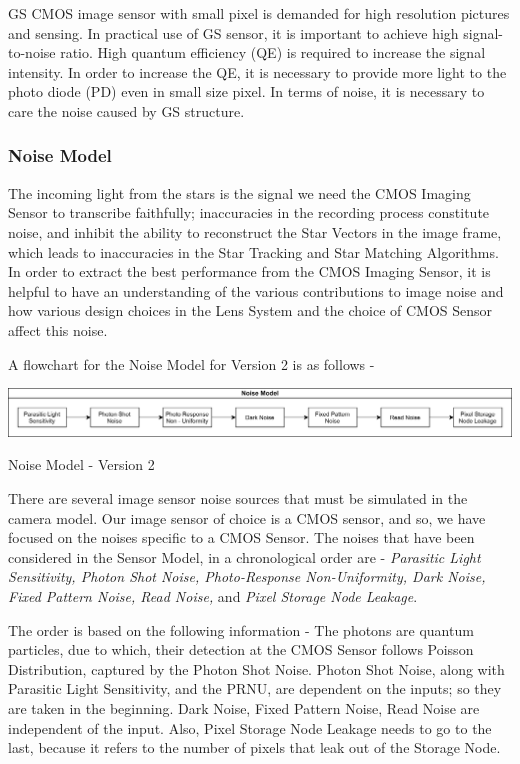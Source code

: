 \documentclass[../../main.tex]{subfiles}
\begin{document}
GS CMOS image sensor with small pixel is demanded for high resolution pictures and sensing. In practical use of GS sensor, it is important to achieve high signal-to-noise ratio. High quantum efficiency (QE) is required to increase the signal intensity. In order to increase the QE, it is necessary to provide more light to the photo diode (PD) even in small size pixel. In terms of noise, it is necessary to care the noise caused by GS structure.


\subsubsection{Noise Model} %
The incoming light from the stars is the signal we need the CMOS Imaging Sensor to transcribe faithfully; inaccuracies in the recording process constitute noise, and inhibit the ability to reconstruct the Star Vectors in the image frame, which leads to inaccuracies in the Star Tracking and Star Matching Algorithms. In order to extract the best performance from the CMOS Imaging Sensor, it is helpful to have an understanding of the various contributions to image noise and how various design choices in the Lens System and the choice of CMOS Sensor affect this noise.

A flowchart for the Noise Model for Version 2 is as follows -

\begin{Flowchart}[h!]
    \centering
    \includegraphics[scale=0.09]{Figures/Model/Noise Model.png}
    \caption{Noise Model - Version 2}
    \label{fig:SIS_v2_NM}
\end{Flowchart}

There are several image sensor noise sources that must be simulated in the camera model. Our image sensor of choice is a CMOS sensor, and so, we have focused on the noises specific to a CMOS Sensor. The noises that have been considered in the Sensor Model, in a chronological order are - \emph{Parasitic Light Sensitivity, Photon Shot Noise, Photo-Response Non-Uniformity, Dark Noise, Fixed Pattern Noise, Read Noise,} and \emph{Pixel Storage Node Leakage}.

The order is based on the following information - 
The photons are quantum particles, due to which, their detection at the CMOS Sensor follows Poisson Distribution, captured by the Photon Shot Noise. Photon Shot Noise, along with Parasitic Light Sensitivity, and the PRNU, are dependent on the inputs; so they are taken in the beginning. Dark Noise, Fixed Pattern Noise, Read Noise are independent of the input. Also, Pixel Storage Node Leakage needs to go to the last, because it refers to the number of pixels that leak out of the Storage Node.
\end{document}
